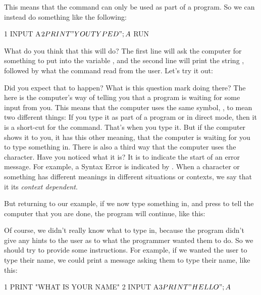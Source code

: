 
\needspace{4cm}
This means that the  command can only be used as part of a
program.  So we can instead do something like the following:

\begin{screenoutput}
1 INPUT A$
2 PRINT "YOU TYPED "; A$
RUN
\end{screenoutput}

\needspace{4cm}
What do you think that this will do?  The first line will ask the
computer for something to put into the variable , and the
second line will print the string , followed by
what the  command read from the user.  Let's try it out:


Did you expect that to happen? What is this question mark doing there?
The  here is the computer's way of telling you that a
program is waiting for some input from you.  This means that the
computer uses the same symbol, , to mean two different things:
If you type it as part of a program or in direct mode, then it is a
short-cut for the  command. That's when you type it. But if
the computer shows it to you, it has this other meaning, that the
computer is waiting for you to type something in. There is also a
third way that the computer uses the  character. Have you
noticed what it is?  It is to indicate the start of an error
message. For example, a Syntax Error is indicated by . When a character or something has different meanings in
different situations or contexts, we say that it its {\em context
  dependent}.

\needspace{4cm}
But returning to our example,  if we now type
something in, and press  to tell the
computer that you are done, the program will continue, like this:


\needspace{4cm}
Of course, we didn't really know what to type in, because the program
didn't give any hints to the user as to what the programmer wanted
them to do. So we should try to provide some instructions.  For
example, if we wanted the user to type their name, we could print a
message asking them to type their name, like this:

\begin{screenoutput}
  1 PRINT "WHAT IS YOUR NAME"
  2 INPUT A$
  3 PRINT "HELLO "; A$
\end{screenoutput}

